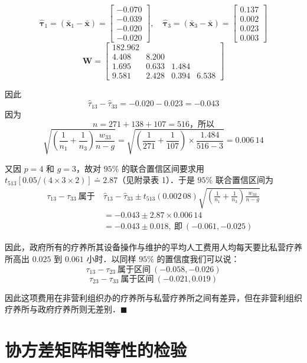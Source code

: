 
\[
\hat{\boldsymbol{\tau}}_1=(\bar{\mathbf{x}}_1-\bar{\mathbf{x}})=\begin{bmatrix}-0.070\\-0.039\\-0.020\\-0.020\end{bmatrix},\quad
\hat{\boldsymbol{\tau}}_3=(\bar{\mathbf{x}}_3-\bar{\mathbf{x}})=\begin{bmatrix}0.137\\0.002\\0.023\\0.003\end{bmatrix}
\]
\[
\mathbf{W}=\begin{bmatrix}182.962&&&\\4.408&8.200&&\\1.695&0.633&1.484&\\9.581&2.428&0.394&6.538\end{bmatrix}
\]

因此
\[
\hat{\tau}_{13}-\hat{\tau}_{33}=-0.020-0.023=-0.043
\]
因为
\[
n=271+138+107=516\text{，所以}
\]
\[
\sqrt{\left(\frac{1}{n_1}+\frac{1}{n_3}\right)\frac{w_{33}}{n-g}}
=\sqrt{\left(\frac{1}{271}+\frac{1}{107}\right)\times\frac{1.484}{516-3}}=0.006\,14
\]

又因 $p=4$ 和 $g=3$，故对 $95\%$ 的联合置信区间要求用 $t_{513}[0.05/(4\times3\times2)]\doteq2.87$（见附录表 1）．于是 $95\%$ 联合置信区间为
\[
\begin{aligned}
\tau_{13}-\tau_{33}\ \text{属于}\ &\hat{\tau}_{13}-\hat{\tau}_{33}\pm t_{513}(0.002\,08)\sqrt{\left(\frac{1}{n_1}+\frac{1}{n_3}\right)\frac{w_{33}}{n-g}}\\
&=-0.043\pm2.87\times0.006\,14\\
&=-0.043\pm0.018,\ \text{即}\ (-0.061,-0.025)
\end{aligned}
\]

因此，政府所有的疗养所其设备操作与维护的平均人工费用人均每天要比私营疗养所高出 $0.025$ 到 $0.061$ 小时．以同样 $95\%$ 的置信度我们可以说：
\[
\tau_{13}-\tau_{23}\ \text{属于区间}\ (-0.058,-0.026)
\]
\[
\tau_{23}-\tau_{33}\ \text{属于区间}\ (-0.021,0.019)
\]

因此这项费用在非营利组织办的疗养所与私营疗养所之间有差异，但在非营利组织疗养所与政府疗养所则无差别．\hfill$\blacksquare$

\section{协方差矩阵相等性的检验}
\label{sec:6.6}

